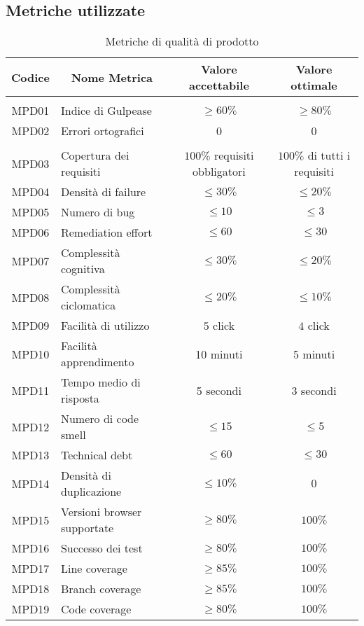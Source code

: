 \subsection{Metriche utilizzate}\label{subsection:metriche_prodotto}
\begin{table}[H]
  \centering
  \renewcommand{\arraystretch}{1.8}
  \begin{tabular}{c|p{6cm}|c|c}
    \rowcolor[HTML]{125E28}
    \color[HTML]{FFFFFF}\textbf{Codice}
    & \multicolumn{1}{c}{\color[HTML]{FFFFFF}\textbf{Nome Metrica}}
    & \color[HTML]{FFFFFF}\textbf{Valore accettabile}
    & \color[HTML]{FFFFFF}\textbf{Valore ottimale}\\
    \hline
    \rowcolor[HTML]{6BC26B}
    \multicolumn{4}{c}{\textbf{Documenti}}\\
    \hline
    MPD01 & Indice di Gulpease & $\ge 60\%$ & $\ge 80\%$ \\
    MPD02 & Errori ortografici & 0 & 0\\
    \hline
    \rowcolor[HTML]{6BC26B}
    \multicolumn{4}{c}{\textbf{Software}}\\
    \hline
    MPD03 & Copertura dei requisiti & $100\%$ requisiti obbligatori & $100\%$ di tutti i requisiti\\
    MPD04 & Densità di failure & $\le30\%$ & $\le20\%$ \\
    MPD05 & Numero di bug & $\le 10$ & $\le 3$ \\
    MPD06 & Remediation effort & $\le 60$ & $\le 30$ \\
    MPD07 & Complessità cognitiva & $\le30\%$ & $\le20\%$ \\
    MPD08 & Complessità ciclomatica & $\le20\%$ & $\le10\%$ \\
    MPD09 & Facilità di utilizzo & $5$ click & $4$ click\\
    MPD10 & Facilità apprendimento & 10 minuti & 5 minuti \\
    MPD11 & Tempo medio di risposta & 5 secondi & 3 secondi \\
    MPD12 & Numero di code smell & $\le 15$ & $\le 5$ \\
    MPD13 & Technical debt & $\le 60$ & $\le 30$ \\
    MPD14 & Densità di duplicazione & $\le 10\%$ & $0$ \\
    MPD15 & Versioni browser supportate & $\ge 80\%$ & $100\%$ \\
    MPD16 & Successo dei test & $\ge 80\%$ & $100\%$ \\
    MPD17 & Line coverage & $\ge 85\%$ & $100\%$ \\
    MPD18 & Branch coverage & $\ge 85\%$ & $100\%$ \\
    MPD19 & Code coverage & $\ge 80\%$ & $100\%$ \\

  \end{tabular}
  \caption{Metriche di qualità di prodotto}
\end{table}

